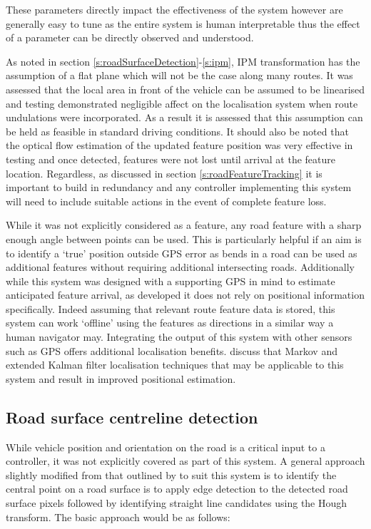 \documentclass[]{aiaa-tc}%
\begin{document}
These parameters directly impact the effectiveness of the system however are generally easy to tune as the entire system is human interpretable thus the effect of a parameter can be directly observed and understood.

As noted in section \ref{s:roadSurfaceDetection}-\ref{s:ipm}, IPM transformation has the assumption of a flat plane which will not be the case along many routes. It was assessed that the local area in front of the vehicle can be assumed to be linearised and testing demonstrated negligible affect on the localisation system when route undulations were incorporated. As a result it is assessed that this assumption can be held as feasible in standard driving conditions. It should also be noted that the optical flow estimation of the updated feature position was very effective in testing and once detected, features were not lost until arrival at the feature location. Regardless, as discussed in section \ref{s:roadFeatureTracking} it is important to build in redundancy and any controller implementing this system will need to include suitable actions in the event of complete feature loss.

While it was not explicitly considered as a feature, any road feature with a sharp enough angle between points can be used. This is particularly helpful if an aim is to identify a `true' position outside GPS error as bends in a road can be used as additional features without requiring additional intersecting roads. Additionally while this system was designed with a supporting GPS in mind to estimate anticipated feature arrival, as developed it does not rely on positional information specifically. Indeed assuming that relevant route feature data is stored, this system can work `offline' using the features as directions in a similar way a human navigator may. Integrating the output of this system with other sensors such as GPS offers additional localisation benefits. \citet{probabalisticRobotics} discuss that Markov and extended Kalman filter localisation techniques that may be applicable to this system and result in improved positional estimation.

\subsection{Road surface centreline detection}

While vehicle position and orientation on the road is a critical input to a controller, it was not explicitly covered as part of this system. A general approach slightly modified from that outlined by \citet{canneyAndHoughLanes} to suit this system is to identify the central point on a road surface is to apply edge detection to the detected road surface pixels followed by identifying straight line candidates using the Hough transform. The basic approach would be as follows: 
\end{document}
